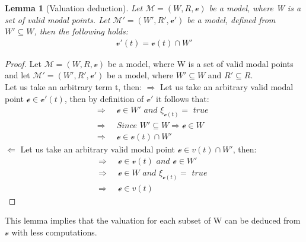 \documentclass{article}
\newtheorem{lemma}[theorem]{Lemma}
\newcommand{\curvedE}{\mathscr{e}}
\newcommand{\vE}{\mathscr{v}}
\newcommand{\vBool}{\xi}
\begin{document}
	\begin{lemma}[Valuation deduction] \label{valuation-deduction}
		Let $\mathcal{M} = (W, R, \vE)$ be a model, where W is a set of valid modal points. 
		Let $\mathcal{M'} = (W', R', \vE')$ be a model, defined from $W' \subseteq W$, then the following holds:
		\begin{align*}
			\vE'(t) =  \vE(t) \cap W'
		\end{align*}
	\end{lemma}
	\begin{proof}
		Let  $\mathcal{M} = (W, R, \vE)$ be a model, where W is a set of valid modal points and let
		$\mathcal{M'} = (W', R', \vE')$ be a model, where $W' \subseteq W$ and $R' \subseteq R$. \\
		Let us take an arbitrary term t, then:
		\newline
		\newline
		$\Longrightarrow$
			Let us take an arbitrary valid modal point $\curvedE \in \vE'(t)$, then by definition
			of $\vE'$ it follows that:
			\begin{align*}
				\Rightarrow \;\;&\curvedE \in W' \textit{ and } \vBool_{\curvedE(t)} = \textit{ true } \\
				\Rightarrow \;\;&\textit{Since } W' \subseteq W \Rightarrow \curvedE \in W \\
				\Rightarrow \;\;&\curvedE \in \vE(t) \cap W'
			\end{align*}
		$\Longleftarrow$
			Let us take an arbitrary valid modal point $\curvedE \in v(t) \cap W'$, then:
			\begin{align*}
				\Rightarrow \;\;&\curvedE \in \vE(t) \textit{ and } \curvedE \in W' \\
				\Rightarrow \;\;&\curvedE \in W \textit{ and } \vBool_{\curvedE(t)} = \textit{ true } \\
				\Rightarrow \;\;&\curvedE \in v(t)
			\end{align*}
	\end{proof}
	This lemma implies that the valuation for each subset of W can be deduced from $\vE$ with less computations.
\end{document}
